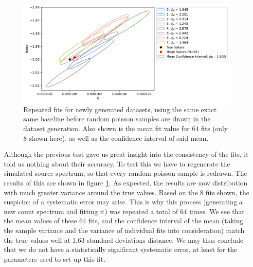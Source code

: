 \documentclass{report}
\begin{document}
\begin{figure}[h]
  \centering
  \includegraphics[width=\textwidth]{Images/Pure_Simulation/combined_plot_repeated_identical_new_gen.pdf}
  \caption{Repeated fits for newly generated datasets, using the same exact same baseline before random poisson samples are drawn in the dataset generation. Also shown is the mean fit value for 64 fits (only 8 shown here), as well as the confidence interval of said mean.}
  \label{fig ident new gen}
\end{figure}

Although the previous test gave us great insight into the consistency of the fits, it told us nothing about their accuracy. To test this we have to regenerate the simulated source spectrum, so that every random poisson sample is redrawn. The results of this are shown in figure \ref{fig ident new gen}. As expected, the results are now distribution with much greater variance around the true values. Based on the 8 fits shown, the suspicion of a systematic error may arise. This is why this process (generating a new count spectrum and fitting it) was repeated a total of 64 times. We see that the mean values of these 64 fits, and the confidence interval of the mean (taking the sample variance and the variance of individual fits into consideration) match the true values well at 1.63 standard deviations distance. We may thus conclude that we do not have a statistically significant systematic error, at least for the parameters used to set-up this fit.
\end{document}
